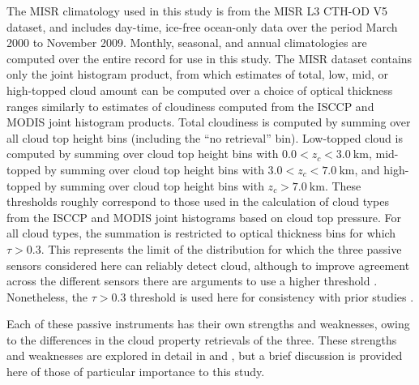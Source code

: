The MISR climatology used in this study is from the MISR L3 CTH-OD V5 dataset, and includes day-time, ice-free ocean-only data over the period March 2000 to November 2009. Monthly, seasonal, and annual climatologies are computed over the entire record for use in this study. The MISR dataset contains only the joint histogram product, from which estimates of total, low, mid, or high-topped cloud amount can be computed over a choice of optical thickness ranges similarly to estimates of cloudiness computed from the ISCCP and MODIS joint histogram products. Total cloudiness is computed by summing over all cloud top height bins (including the ``no retrieval'' bin). Low-topped cloud is computed by summing over cloud top height bins with $0.0<z_c<3.0~\text{km}$, mid-topped by summing over cloud top height bins with $3.0<z_c<7.0~\text{km}$, and high-topped by summing over cloud top height bins with $z_c>7.0~\text{km}$. These thresholds roughly correspond to those used in the calculation of cloud types from the ISCCP and MODIS joint histograms based on cloud top pressure. For all cloud types, the summation is restricted to optical thickness bins for which $\tau>0.3$. This represents the limit of the distribution for which the three passive sensors considered here can reliably detect cloud, although to improve agreement across the different sensors there are arguments to use a higher threshold \citep{marchand_et_al_2010,pincus_et_al_2011}. Nonetheless, the $\tau>0.3$ threshold is used here for consistency with prior studies \citep[e.g.,][]{marchand_and_ackerman_2010}.

Each of these passive instruments has their own strengths and weaknesses, owing to the differences in the cloud property retrievals of the three. These strengths and weaknesses are explored in detail in \cite{marchand_et_al_2010} and \cite{pincus_et_al_2011}, but a brief discussion is provided here of those of particular importance to this study.

